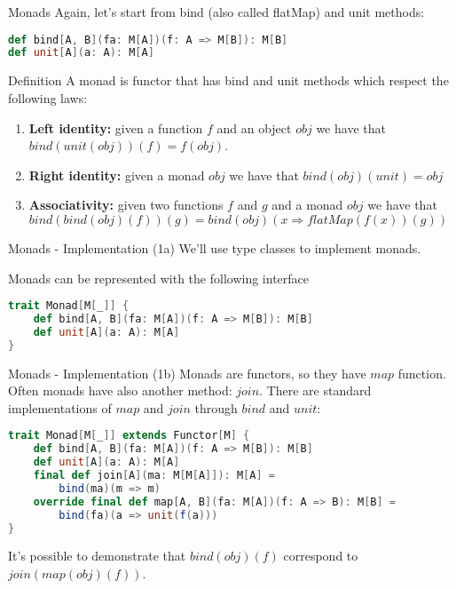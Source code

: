 \begin{frame}[fragile]{Monads}
	Again, let's start from bind (also called flatMap) and unit methods:
\begin{lstlisting}[language=scala]
def bind[A, B](fa: M[A])(f: A => M[B]): M[B]
def unit[A](a: A): M[A]
\end{lstlisting}
	\pause
	\begin{block}{Definition}
		A monad is functor that has bind and unit methods which respect the following laws:
		\begin{enumerate}[<+->]
			\item \textbf{Left identity:}  given a function $f$ and an object $obj$ we have that $bind(unit(obj))(f) = f(obj)$.
			\item \textbf{Right identity:} given a monad $obj$ we have that $bind(obj)(unit) = obj$
			\item \textbf{Associativity:} given two functions $f$ and $g$ and a monad $obj$ we have that 
			$bind(bind(obj)(f))(g) = bind(obj)(x \Rightarrow flatMap(f(x))(g))$
		\end{enumerate}
	\end{block}
\end{frame}

\begin{frame}[fragile]{Monads - Implementation (1a)}	
	We'll use type classes to implement monads.
	
	Monads can be represented with the following interface
\begin{lstlisting}[language=scala]
trait Monad[M[_]] {
	def bind[A, B](fa: M[A])(f: A => M[B]): M[B]
	def unit[A](a: A): M[A]
}			
\end{lstlisting}
\end{frame}

\begin{frame}[fragile]{Monads - Implementation (1b)}	
	Monads are functors, so they have $map$ function.
	Often monads have also another method: $join$.
	There are standard implementations of $map$ and $join$ through $bind$ and $unit$:
\begin{lstlisting}[language=scala]
trait Monad[M[_]] extends Functor[M] {
	def bind[A, B](fa: M[A])(f: A => M[B]): M[B]
	def unit[A](a: A): M[A]
	final def join[A](ma: M[M[A]]): M[A] = 
		bind(ma)(m => m)
	override final def map[A, B](fa: M[A])(f: A => B): M[B] = 
		bind(fa)(a => unit(f(a)))
}			
\end{lstlisting}
	It's possible to demonstrate that $bind(obj)(f)$ correspond to $join(map(obj)(f))$.
\end{frame}

